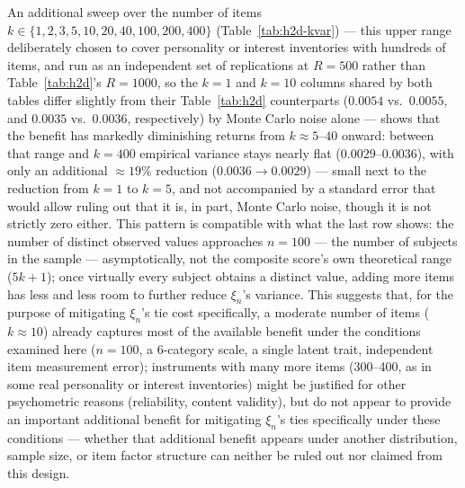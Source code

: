 \documentclass[article]{ajs}
\begin{document}
An additional sweep over the number of items $k \in
\{1,2,3,5,10,20,40,100,200,400\}$ (Table~\ref{tab:h2d-kvar}) --- this
upper range deliberately chosen to cover personality or interest
inventories with hundreds of items, and run as an independent set of
replications at $R=500$ rather than Table~\ref{tab:h2d}'s $R=1000$, so
the $k=1$ and $k=10$ columns shared by both tables differ slightly from
their Table~\ref{tab:h2d} counterparts ($0.0054$ vs.\ $0.0055$, and
$0.0035$ vs.\ $0.0036$, respectively) by Monte Carlo noise alone ---
shows that the benefit has
markedly diminishing returns from $k\approx 5$--$40$ onward: between
that range and $k=400$ empirical variance stays nearly flat
($0.0029$--$0.0036$), with only an additional $\approx 19\%$ reduction
($0.0036 \to 0.0029$) --- small next to the reduction from $k=1$ to
$k=5$, and not accompanied by a standard error that would allow ruling
out that it is, in part, Monte Carlo noise, though it is not strictly
zero either. This pattern is compatible with what the last row shows:
the number of distinct observed values approaches $n=100$ --- the
number of subjects in the sample --- asymptotically, not the
composite score's own theoretical range ($5k+1$); once virtually every
subject obtains a distinct value, adding more items has less and less
room to further reduce $\xi_n$'s variance. This suggests that, for the
purpose of mitigating $\xi_n$'s tie cost specifically, a moderate
number of items ($k\approx 10$) already captures most of the available
benefit under the conditions examined here ($n=100$, a 6-category
scale, a single latent trait, independent item measurement error);
instruments with many more items (300--400, as in some real
personality or interest inventories) might be justified for other
psychometric reasons (reliability, content validity), but do not
appear to provide an important additional benefit for mitigating
$\xi_n$'s ties specifically under these conditions --- whether that
additional benefit appears under another distribution, sample size, or
item factor structure can neither be ruled out nor claimed from this
design.

\begin{table}[H]
\caption{\label{tab:h2d-kvar}Effect of the number of items $k$ on $\xi_n$'s empirical variance, same conditions as Table~\ref{tab:h2d} ($R=500$; $n=100$).}
\begin{center}
\end{center}
\end{table}
\end{document}
